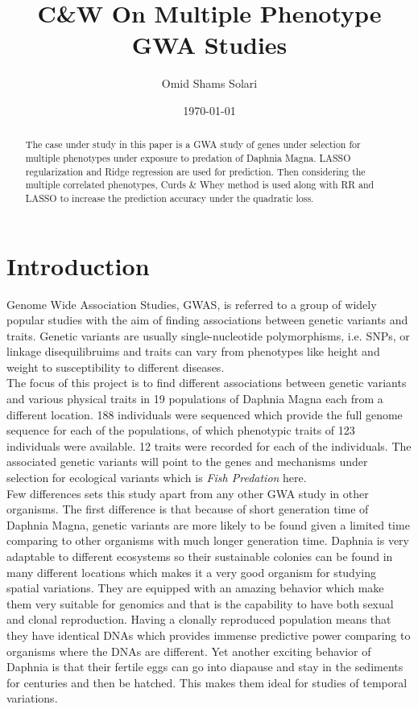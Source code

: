 \documentclass[a4paper]{article}
\title{C\&W On Multiple Phenotype GWA Studies}
\author{Omid Shams Solari}
\date{\today}
\begin{document}
\maketitle

\begin{abstract}
The case under study in this paper is a GWA study of genes under selection for multiple phenotypes under exposure to predation of Daphnia Magna. LASSO regularization and Ridge regression are used for prediction. Then considering the multiple correlated phenotypes, Curds \& Whey method is used along with RR and LASSO to increase the prediction accuracy under the quadratic loss.
\end{abstract}

\section{Introduction}
\label{sec:introduction}

Genome Wide Association Studies, GWAS, is referred to a group of widely popular studies with the aim of finding associations between genetic variants and traits. Genetic variants are usually single-nucleotide polymorphisms, i.e. SNPs, or linkage disequilibruims and traits can vary from phenotypes like height and weight to susceptibility to different diseases.\\
The focus of this project is to find different associations between genetic variants and various physical traits in 19 populations of Daphnia Magna each from a different location. 188 individuals were sequenced which provide the full genome sequence for each of the populations, of which phenotypic traits of 123 individuals were available. 12 traits were recorded for each of the individuals. The associated genetic variants will point to the genes and mechanisms under selection for ecological variants which is \textit{Fish Predation} here.\\
Few differences sets this study apart from any other GWA study in other organisms. The first difference is that because of short generation time of Daphnia Magna, genetic variants are more likely to be found given a limited time comparing to other organisms with much longer generation time. Daphnia is very adaptable to different ecosystems so their sustainable colonies can be found in many different locations which makes it a very good organism for studying spatial variations. They are equipped with an amazing behavior which make them very suitable for genomics and that is the capability to have both sexual and clonal reproduction. Having a clonally reproduced population means that they have identical DNAs which provides immense predictive power comparing to organisms where the DNAs are different. Yet another exciting behavior of Daphnia is that their fertile eggs can go into diapause and stay in the sediments for centuries and then be hatched. This makes them ideal for studies of temporal variations. \\
\end{document}
